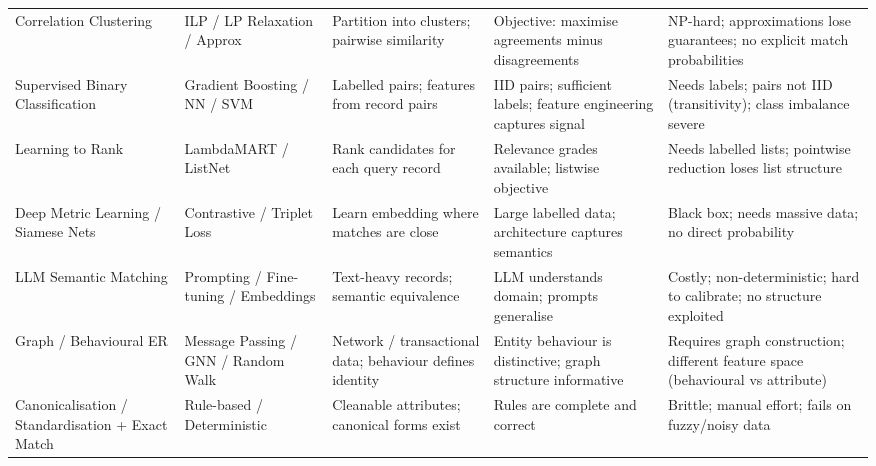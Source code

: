 \begin{longtable}{p{2.5cm}p{2.5cm}p{3.5cm}p{3.5cm}p{3.5cm}}
	Correlation Clustering                           & ILP / LP Relaxation / Approx         & Partition into clusters; pairwise similarity                         & Objective: maximise agreements minus disagreements                                     & NP-hard; approximations lose guarantees; no explicit match probabilities                         \\

	Supervised Binary Classification                 & Gradient Boosting / NN / SVM         & Labelled pairs; features from record pairs                           & IID pairs; sufficient labels; feature engineering captures signal                      & Needs labels; pairs not IID (transitivity); class imbalance severe                               \\

	Learning to Rank                                 & LambdaMART / ListNet                 & Rank candidates for each query record                                & Relevance grades available; listwise objective                                         & Needs labelled lists; pointwise reduction loses list structure                                   \\

	Deep Metric Learning / Siamese Nets              & Contrastive / Triplet Loss           & Learn embedding where matches are close                              & Large labelled data; architecture captures semantics                                   & Black box; needs massive data; no direct probability                                             \\

	LLM Semantic Matching                            & Prompting / Fine-tuning / Embeddings & Text-heavy records; semantic equivalence                             & LLM understands domain; prompts generalise                                             & Costly; non-deterministic; hard to calibrate; no structure exploited                             \\

	Graph / Behavioural ER                           & Message Passing / GNN / Random Walk  & Network / transactional data; behaviour defines identity             & Entity behaviour is distinctive; graph structure informative                           & Requires graph construction; different feature space (behavioural vs attribute)                  \\

	Canonicalisation / Standardisation + Exact Match & Rule-based / Deterministic           & Cleanable attributes; canonical forms exist                          & Rules are complete and correct                                                         & Brittle; manual effort; fails on fuzzy/noisy data                                                \\


\end{longtable}
